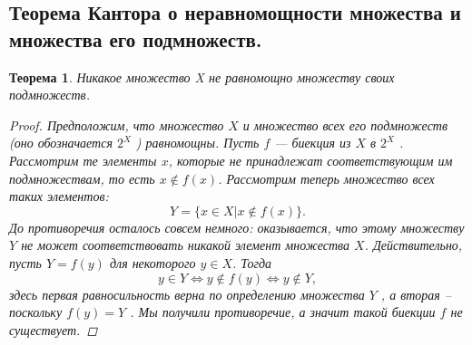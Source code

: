 \documentclass{article}
\newtheorem{theorem}{Теорема}
\begin{document}
\subsection{Теорема Кантора о неравномощности множества и множества его подмножеств.}
\begin{theorem}
Никакое множество X не равномощно множеству своих подмножеств.
\begin{proof}
Предположим, что множество $X$ и множество всех его подмножеств (оно обозначается $2^X$ ) равномощны. Пусть $f$ — биекция из $X$ в $2^X$ . Рассмотрим те элементы $x$, которые не принадлежат соответствующим им подмножествам, то есть $x \notin f(x)$. Рассмотрим теперь множество всех таких элементов:
\[
Y = \{x \in X | x \notin f(x)\}.
\]
До противоречия осталось совсем немного: оказывается, что этому множеству $Y$ не может соответствовать никакой элемент множества $X$. Действительно, пусть $Y = f(y)$ для некоторого $y \in X$. Тогда
\[
y \in Y
\Leftrightarrow
y \notin f(y)
\Leftrightarrow
y \notin Y,
\]
здесь первая равносильность верна по определению множества $Y$ , а вторая – поскольку $f (y) = Y$ . Мы получили противоречие, а значит такой биекции $f$ не существует.
\end{proof}
\end{theorem}
\end{document}
